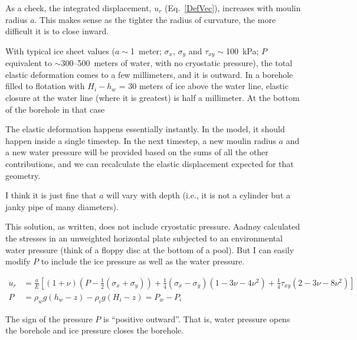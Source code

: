 \documentclass[11pt]{article}
\begin{document}
As a check, the integrated displacement, $u_r$ (Eq.~\ref{DefVec}), increases with moulin radius $a$.  This makes sense as the tighter the radius of curvature, the more difficult it is to close inward.

With typical ice sheet values ($a\sim$1~meter; $\sigma_{x}$, $\sigma_y$ and $\tau_{xy}\sim$100~kPa; $P$ equivalent to $\sim$300--500~meters of water, with no cryostatic pressure), the total elastic deformation comes to a few millimeters, and it is outward.  In a borehole filled to flotation with $H_i-h_w$ = 30 meters of ice above the water line, elastic closure at the water line (where it is greatest) is half a millimeter.  At the bottom of the borehole in that case

The elastic deformation happens essentially instantly.  In the model, it should happen inside a single timestep.  In the next timestep, a new moulin radius $a$ and a new water pressure will be provided based on the sums of all the other contributions, and we can recalculate the elastic displacement expected for that geometry.

I think it is just fine that $a$ will vary with depth (i.e., it is not a cylinder but a janky pipe of many diameters).

This solution, as written, does not include cryostatic pressure.   Aadn\o{}y calculated the stresses in an unweighted horizontal plate subjected to an environmental water pressure (think of a floppy disc at the bottom of a pool).  But I can easily modify $P$ to include the ice pressure as well as the water pressure.


\begin{equation}
	\begin{aligned}
	u_r &=  \frac{a}{E} \left[ ( 1 + \nu ) \left( P - \frac{1}{2} (\sigma_x + \sigma_y) \right) + \frac{1}{4} (\sigma_x - \sigma_y) (1 - 3 \nu - 4 \nu^2) +   \frac{1}{4} \tau_{xy} (2 - 3 \nu - 8 \nu^2)\right] \\
	P & = \rho_w g (h_w-z) - \rho_i g (H_i-z) = P_w - P_i
	\end{aligned}
\label{DeformationIceWaterPressures}
\end{equation}

\noindent The sign of the pressure $P$ is ``positive outward''.  That is, water pressure opens the borehole and ice pressure closes the borehole.
\end{document}

